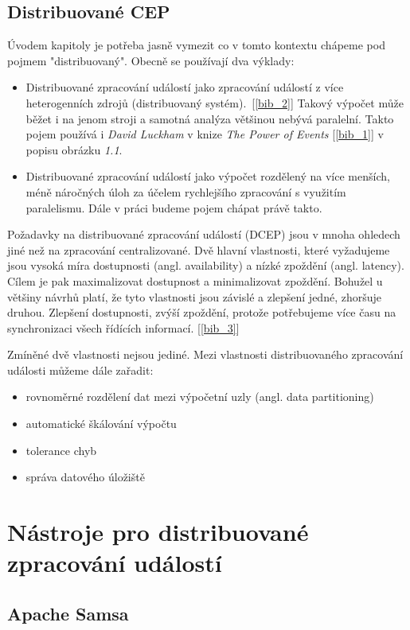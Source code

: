 \documentclass[
  digital, %
  table,   %
  nolof,     %
  nolot,     %
  twoside,
  nocover,
  monochrome,
  12pt
]{fithesis3}
\begin{document}
\section{Distribuované CEP}
Úvodem kapitoly je potřeba jasně vymezit co v tomto kontextu chápeme pod pojmem "distribuovaný". Obecně se používají dva výklady:
\begin{itemize}
  \item Distribuované zpracování událostí jako zpracování událostí z více heterogenních zdrojů (distribuovaný systém).~[\ref{bib_2}] Takový výpočet může běžet i na jenom stroji a samotná analýza většinou nebývá paralelní. Takto pojem používá i \textit{David Luckham} v knize \textit{The Power of Events} [\ref{bib_1}] v popisu obrázku \textit{1.1}.
  \item Distribuované zpracování událostí jako výpočet rozdělený na více menších, méně náročných úloh za účelem rychlejšího zpracování s využitím paralelismu. Dále v práci budeme pojem chápat právě takto.
\end{itemize}

Požadavky na distribuované zpracování událostí (DCEP) jsou v mnoha ohledech jiné než na zpracování centralizované. Dvě hlavní vlastnosti, které vyžadujeme jsou vysoká míra dostupnosti (angl. availability) a nízké zpoždění (angl. latency). Cílem je pak maximalizovat dostupnost a minimalizovat zpoždění. Bohužel u většiny návrhů platí, že tyto vlastnosti jsou závislé a zlepšení jedné, zhoršuje druhou. Zlepšení dostupnosti, zvýší zpoždění, protože potřebujeme více času na synchronizaci všech řídících informací. [\ref{bib_3}]

Zmíněné dvě vlastnosti nejsou jediné. Mezi vlastnosti distribuovaného zpracování události můžeme dále zařadit:
\begin{itemize}
  \item rovnoměrné rozdělení dat mezi výpočetní uzly (angl. data partitioning)
  \item automatické škálování výpočtu
  \item tolerance chyb
  \item správa datového úložiště
\end{itemize}

\chapter{Nástroje pro distribuované zpracování událostí}
\section{Apache Samsa}
\end{document}
